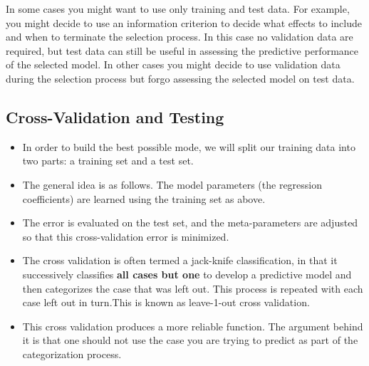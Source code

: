 \documentclass[a4paper,12pt]{article}
\begin{document}
In some cases you might want to use only training and test data. For example, you might decide to use an information criterion to decide what effects to include and when to terminate the selection process. In this case no validation data are required, but test data can still be useful in assessing the predictive performance of the selected model. In other cases you might decide to use validation data during the selection process but forgo assessing the selected model on test data. 

	

\subsection{Cross-Validation and Testing}
\begin{itemize}
	\item In order to build the best possible mode, we will split our training data into two parts: a training set and a test set. 
	
	\item 	The general idea is as follows. The model parameters (the regression coefficients) are learned using the training set as above. 
	\item The error is evaluated on the test set, and the meta-parameters are adjusted so that this cross-validation error is minimized. 
	

	\item The cross validation is often termed a jack-knife classification, in that
	it successively classifies \textbf{all cases but one} to develop a predictive model and then
	categorizes the case that was left out. This process is repeated with each case left out in
	turn.This is known as leave-1-out cross validation. 
	
	\item This cross validation produces a more reliable function. The argument behind it is that
	one should not use the case you are trying to predict as part of the categorization process.
\end{itemize}
\end{document}
